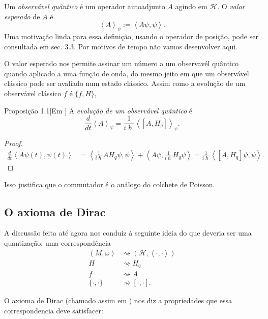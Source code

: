 Um \textit{observável quântico} é um operador autoadjunto $A$ agindo em $\mathcal{H}$. O \textit{valor esperado} de $A$ é
\[\left<A\right>_\psi:=\left<A\psi,\psi\right>.\]
Uma motivação linda para essa definição, usando o operador de posição, pode ser consultada em \cite{hallq} sec. 3.3. Por motivos de tempo não vamos desenvolver aqui.

O valor esperado nos permite assinar um número a um observavél quântico quando aplicado a uma função de onda, do mesmo jeito em que um observável clássico pode ser avaliado num estado clássico. Assim como a evolução de um observável clássico $f$ é $\{f,H\}$,
\begin{thing3}{Proposição 1.1}[Em \cite{wang}]\leavevmode
	A \textit{evolução de um observável quântico} é
\[\frac{d}{dt}\left<A\right>_{\psi}=\frac{1}{i\hslash}\left<[A,H_q]\right>_\psi.\]
\end{thing3}
\begin{proof}\leavevmode
\begin{align*}
	\frac{d}{dt}\left<A\psi(t),\psi(t)\right>&=\left<\frac{1}{i\hslash}AH_q\psi,\psi\right>+\left<A\psi,\frac{1}{i\hslash}H_q\psi\right>=\frac{1}{i\hslash}\left<[A,H_q]\psi,\psi\right>.
\end{align*}
\end{proof}
Isso justifica que o commutador é o análogo do colchete de Poisson.

\subsection{O axioma de Dirac}

A discussão feita até agora nos conduiz à seguinte ideia do que deveria ser uma quantização: uma correspondência
\begin{align*}
	(M,\omega)&\rightsquigarrow (\mathcal{H},\left<\cdot,\cdot\right>)\\
	H&\rightsquigarrow H_q\\
	f&\rightsquigarrow A\\
	\{\cdot,\cdot\}&\rightsquigarrow [\cdot,\cdot].
\end{align*}

O axioma de Dirac (chamado assim em \cite{wang}) nos diz a propriedades que essa correspondencia deve satisfacer:

